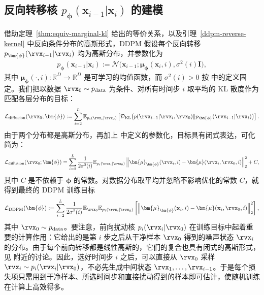 \subsection{反向转移核 $p_{\bm{\phi}}(\mathbf{x}_{i-1}|\mathbf{x}_i)$ 的建模}
借助定理~\ref{thm:equiv-marginal-kl} 给出的等价关系，以及引理~\ref{ddpm-reverse-kernel} 中反向条件分布的高斯形式，DDPM 假设每个反向转移 $p_{\bm{\phi}}(\rvx_{i-1}| \rvx_i)$ 均为高斯分布，并参数化为
\begin{align}\label{eq:def-reverse}
    p_{\bm{\phi}}(\mathbf{x}_{i-1}|\mathbf{x}_i) := \mathcal{N}\big(\mathbf{x}_{i-1}; \bm{\mu}_{\bm{\phi}}(\mathbf{x}_i, i), \sigma^2(i) \mathbf{I}\big),
\end{align}
其中 $\bm{\mu}_{\bm{\phi}}(\cdot, i) \colon \mathbb{R}^D \to \mathbb{R}^D$ 是可学习的均值函数，而 $\sigma^2(i) > 0$ 按  中的定义固定。我们把以数据 $\rvx_0 \sim p_{\text{data}}$ 为条件、对所有时间步 $i$ 取平均的 KL 散度作为匹配各层分布的目标：
\begin{align}\label{eq:ddpm-diffusion}
    \mathcal{L}_{\text{diffusion}}(\rvx_0;\bm{\phi}) := \sum_{i=2}^L \mathbb{E}_{p_i(\rvx_i|\rvx_0)}\left[\mathcal{D}_{\text{KL}}\big(p(\rvx_{i-1}|\rvx_i, \rvx_0)  \Vert  p_{\bm{\phi}}(\rvx_{i-1}|\rvx_i)\big)\right].
\end{align}
由于两个分布都是高斯分布，再加上  中定义的参数化，目标具有闭式表达，可化简为：
\begin{align}\label{eq:ddpm-diffusion-simp}
    \mathcal{L}_{\text{diffusion}}(\rvx_0;\bm{\phi}) = \sum_{i=2}^L \frac{1}{2\sigma^2(i)}  \mathbb{E}_{p_i(\rvx_i|\rvx_0)}\left\| \bm{\mu}_{\bm{\phi}}(\rvx_i, i) - \bm{\mu}(\rvx_i, \rvx_0, i) \right\|_2^2 + C,
\end{align}
其中 $C$ 是不依赖于 $\bm{\phi}$ 的常数。对数据分布取平均并忽略不影响优化的常数 $C$，就得到最终的 DDPM 训练目标
\begin{align}
\begin{aligned}
    \label{eq:ddpm-mean-loss}
    \mathcal{L}_{\text{DDPM}}(\bm{\phi}) := \sum_{i=2}^L \frac{1}{2\sigma^2(i)}  \mathbb{E}_{\rvx_0} \mathbb{E}_{p_i(\rvx_i|\rvx_0)} \left[ \left\| \bm{\mu}_{\bm{\phi}}(\mathbf{x}_i, i) - \bm{\mu}(\mathbf{x}_i, \rvx_0, i) \right\|_2^2 \right],
\end{aligned}
\end{align}
其中 $\rvx_0\sim p_{\mathrm{data}}$。要注意，前向扰动核 $p_i(\rvx_i | \rvx_0)$ 在训练目标中起着重要的计算作用：它给出的是第 $i$ 步之后从干净样本
$\rvx_0$ 得到的噪声状态 $\rvx_i$ 的分布。由于每个前向转移都是线性高斯的，它们的复合也具有闭式的高斯形式，见  附近的讨论。因此，选好时间步 $i$ 之后，可以直接从 $\rvx_0$ 采样 $\rvx_i \sim p_i(\rvx_i | \rvx_0)$，不必先生成中间状态
$\rvx_1,\ldots,\rvx_{i-1}$。于是每个损失项只需用到干净样本、所选时间步和直接扰动得到的样本即可估计，使随机训练在计算上高效得多。


